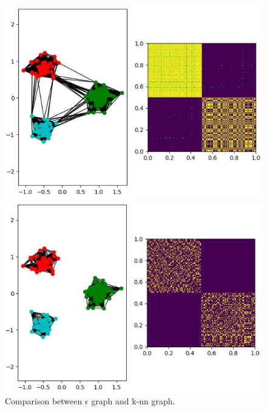 \documentclass[a4paper, 11pt]{article}
\begin{document}
    \begin{figure}[!ht]
     \begin{minipage}{0.48\textwidth}
     \begin{center}
         \includegraphics[width=\textwidth]{images/eps_05_blobs.jpg}
         \caption{$\epsilon = 0.5$}
     \end{center}
     \end{minipage}
     \hfill
     \begin{minipage}{0.48\textwidth}
     \begin{center}
         \includegraphics[width=\textwidth]{images/knn_20_blobs.jpg}
         \caption{$k = 20$}
     \end{center}
     \end{minipage}
        \caption{Comparison between $\epsilon$ graph and k-nn graph.}
        \label{fig:blobs-dataset}
    \end{figure}
\end{document}
